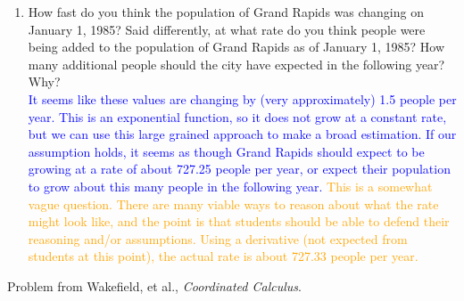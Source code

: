 \documentclass{ximera}
\begin{document}
\begin{exercise}
\begin{enumerate}
{        For $[5,8]$:\\
        $\frac{P(8)-P(5)}{8-5}=\frac{187639.06-185444.20}{3}=731.62$ people per year\\
        For $[5,7]$:\\
        $\frac{P(7)-P(5)}{7-5}=\frac{186904.57-185444.20}{2}=730.18$ people per year\\
        For $[5,6]$:\\
        $\frac{P(6)-P(5)}{6-5}=\frac{186172.94-185444.20}{1}=728.74$ people per year\\}
        \textcolor{orange}{This is a prime example of a good divide and conquer group problem.  Each student can take one interval and do the calcuation.}
        \item How fast do you think the population of Grand Rapids was changing on January 1, 1985? Said differently, at what rate do you think people were being added to the population of Grand Rapids as of January 1, 1985? How many additional people should the city have expected in the following year? Why?\\
        \textcolor{blue}{It seems like these values are changing by (very approximately) 1.5 people per year.  This is an exponential function, so it does not grow at a constant rate, but we can use this large grained approach to make a broad estimation.  If our assumption holds, it seems as though Grand Rapids should expect to be growing at a rate of about 727.25 people per year, or expect their population to grow about this many people in the following year.}
        \textcolor{orange}{This is a somewhat vague question. There are many viable ways to reason about what the rate might look like, and the point is that students should be able to defend their reasoning and/or assumptions.  Using a derivative (not expected from students at this point), the actual rate is about 727.33 people per year.}
  \end{enumerate}
  Problem from Wakefield, et al., \textit {Coordinated Calculus}.
\end{exercise}
\end{document}

